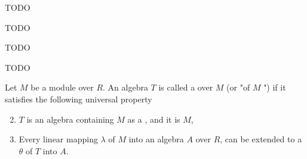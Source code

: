 \begin{definition}[FreeAlgebra]
    \label{FreeAlgebra}

    TODO

\end{definition}

\begin{definition}[LinearMap]
    \label{LinearMap}

    TODO

\end{definition}

\begin{definition}[RingQuot]
    \label{RingQuot}

    TODO

\end{definition}

\begin{definition}
    \label{TensorAlgebra_Rel}

    TODO

\end{definition}

\begin{definition}
    \label{TensorAlgebra}

    Let $M$ be a module over $R$. An algebra $T$ is called a  over $M$ (or "of $M$ ")
    if it satisfies the following universal property

    \begin{enumerate}
    \setcounter{enumi}{1}
    \item $T$ is an algebra containing $M$ as a , and it is  $M$,
    \item Every linear mapping $\lambda$ of $M$ into an algebra $A$ over $R$, can be extended to 
    a  $\theta$ of $T$ into $A$.
    \end{enumerate}

\end{definition}

